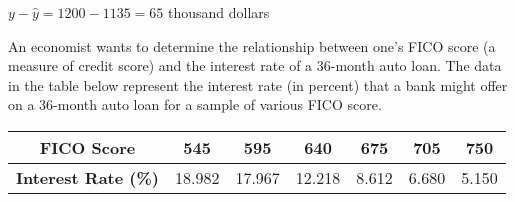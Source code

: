 \documentclass[noanswers]{exam}
\begin{document}
\begin{questions}
\begin{parts}
\begin{solution}[\stretch{1}]
$y-\hat{y}=1200-1135=65$ thousand dollars
\vspace{3mm}

\end{solution}

\end{parts}

\newpage

\question An economist wants to determine the relationship between one's FICO score (a measure of credit score) and the interest rate of a 36-month auto loan. The data in the table below represent the interest rate (in percent) that a bank might offer on a 36-month auto loan for a sample of various FICO score.

\begin{center}
\begin{tabular}{|c|c|c|c|c|c|c|}
\hline
\textbf{FICO Score} & 545 & 595 & 640 & 675 & 705 & 750 \\
\hline
\textbf{Interest Rate (\%)} & 18.982 & 17.967 & 12.218 & 8.612 & 6.680 & 5.150 \\
\hline
\end{tabular}
\end{center}

\vspace{2mm}

\end{questions}
\end{document}
